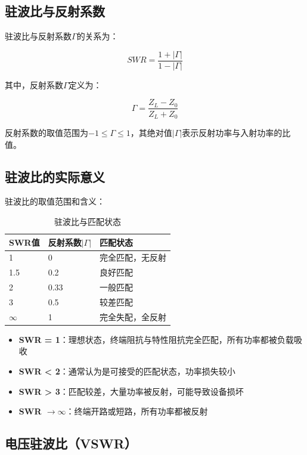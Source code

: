 \subsection{驻波比与反射系数}
\label{sec:swr_reflection}

驻波比与反射系数$\Gamma$的关系为：

\[ SWR = \frac{1 + |\Gamma|}{1 - |\Gamma|} \]

其中，反射系数$\Gamma$定义为：

\[ \Gamma = \frac{Z_L - Z_0}{Z_L + Z_0} \]

反射系数的取值范围为$-1 \leq \Gamma \leq 1$，其绝对值$|\Gamma|$表示反射功率与入射功率的比值。

\subsection{驻波比的实际意义}
\label{sec:swr_practical}

驻波比的取值范围和含义：

\begin{table}[htbp]
    \centering
    \small
    \caption{驻波比与匹配状态}
    \begin{tabular}{|p{2cm}|p{3cm}|p{3.5cm}|}
        \hline
        \textbf{SWR值} & \textbf{反射系数$|\Gamma|$} & \textbf{匹配状态} \\
        \hline
        1 & 0 & 完全匹配，无反射 \\
        \hline
        1.5 & 0.2 & 良好匹配 \\
        \hline
        2 & 0.33 & 一般匹配 \\
        \hline
        3 & 0.5 & 较差匹配 \\
        \hline
        $\infty$ & 1 & 完全失配，全反射 \\
        \hline
    \end{tabular}
\end{table}

\begin{itemize}
    \item \textbf{SWR = 1}：理想状态，终端阻抗与特性阻抗完全匹配，所有功率都被负载吸收
    \item \textbf{SWR < 2}：通常认为是可接受的匹配状态，功率损失较小
    \item \textbf{SWR > 3}：匹配较差，大量功率被反射，可能导致设备损坏
    \item \textbf{SWR $\to \infty$}：终端开路或短路，所有功率都被反射
\end{itemize}

\subsection{电压驻波比（VSWR）}
\label{sec:vswr}

